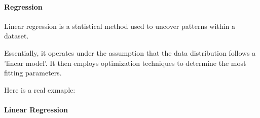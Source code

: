 \paragraph{Regression}

Linear regression is a statistical method 
used to uncover patterns within a dataset. 

Essentially, it operates under the assumption 
that the data distribution follows a 'linear model'. 
It then employs optimization techniques to determine 
the most fitting parameters.

Here is a real exmaple:



\paragraph{Linear Regression}

